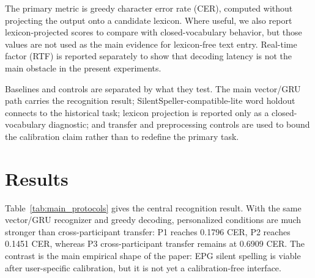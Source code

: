 
The primary metric is greedy character error rate (CER), computed without projecting the output onto a candidate lexicon. Where useful, we also report lexicon-projected scores to compare with closed-vocabulary behavior, but those values are not used as the main evidence for lexicon-free text entry. Real-time factor (RTF) is reported separately to show that decoding latency is not the main obstacle in the present experiments.


Baselines and controls are separated by what they test. The main vector/GRU path carries the recognition result; SilentSpeller-compatible-lite word holdout connects to the historical task; lexicon projection is reported only as a closed-vocabulary diagnostic; and transfer and preprocessing controls are used to bound the calibration claim rather than to redefine the primary task.


\section{Results}
Table~\ref{tab:main_protocols} gives the central recognition result. With the same vector/GRU recognizer and greedy decoding, personalized conditions are much stronger than cross-participant transfer: P1 reaches 0.1796 CER, P2 reaches 0.1451 CER, whereas P3 cross-participant transfer remains at 0.6909 CER. The contrast is the main empirical shape of the paper: EPG silent spelling is viable after user-specific calibration, but it is not yet a calibration-free interface.

